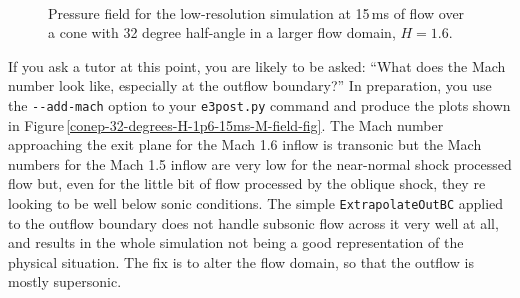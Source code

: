 \begin{figure}[htbp]
\begin{center}
\\
\end{center}
\caption{Pressure field for the low-resolution simulation at 15\,ms
         of flow over a cone with 32 degree half-angle
         in a larger flow domain, $H=1.6$.}
\label{conep-32-degrees-H-1p6-15ms-fig}
\end{figure}

\medskip
If you ask a tutor at this point, you are likely to be asked: 
``What does the Mach number look like, especially at the outflow boundary?''
In preparation, you use the \verb!--add-mach! option to your \verb!e3post.py! command
and produce the plots shown in Figure\,\ref{conep-32-degrees-H-1p6-15ms-M-field-fig}.
The Mach number approaching the exit plane for the Mach 1.6 inflow is transonic but
the Mach numbers for the Mach 1.5 inflow are very low for the near-normal shock processed flow
but, even for the little bit of flow processed by the oblique shock, they re looking to be
well below sonic conditions.
The simple \verb!ExtrapolateOutBC! applied to the outflow boundary 
does not handle subsonic flow across it very well at all,
and results in the whole simulation not being a good representation of the physical situation.
The fix is to alter the flow domain, so that the outflow is mostly supersonic.

